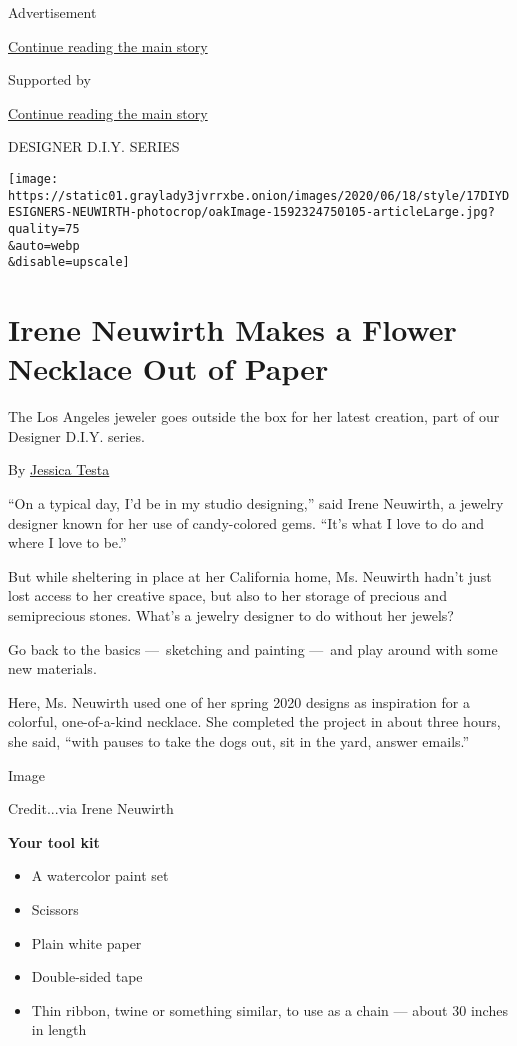 Advertisement

\protect\hyperlink{after-top}{Continue reading the main story}

Supported by

\protect\hyperlink{after-sponsor}{Continue reading the main story}

DESIGNER D.I.Y. SERIES

\texttt{[image: https://static01.graylady3jvrrxbe.onion/images/2020/06/18/style/17DIYDESIGNERS-NEUWIRTH-photocrop/oakImage-1592324750105-articleLarge.jpg?quality=75\\\&auto=webp\\\&disable=upscale]}

\hypertarget{irene-neuwirth-makes-a-flower-necklace-out-of-paper}{%
\section{Irene Neuwirth Makes a Flower Necklace Out of
Paper}\label{irene-neuwirth-makes-a-flower-necklace-out-of-paper}}

The Los Angeles jeweler goes outside the box for her latest creation,
part of our Designer D.I.Y. series.

By \href{https://www.nytimes3xbfgragh.onion/by/jessica-testa}{Jessica
Testa}

``On a typical day, I'd be in my studio designing,'' said Irene
Neuwirth, a jewelry designer known for her use of candy-colored gems.
``It's what I love to do and where I love to be.''

But while sheltering in place at her California home, Ms. Neuwirth
hadn't just lost access to her creative space, but also to her storage
of precious and semiprecious stones. What's a jewelry designer to do
without her jewels?

Go back to the basics ---~sketching and painting ---~and play around
with some new materials.

Here, Ms. Neuwirth used one of her spring 2020 designs as inspiration
for a colorful, one-of-a-kind necklace. She completed the project in
about three hours, she said, ``with pauses to take the dogs out, sit in
the yard, answer emails.''

Image

Credit...via Irene Neuwirth

\textbf{Your tool kit}

\begin{itemize}
\item
  A watercolor paint set
\item
  Scissors
\item
  Plain white paper
\item
  Double-sided tape
\item
  Thin ribbon, twine or something similar, to use as a chain --- about
  30 inches in length
\end{itemize}

